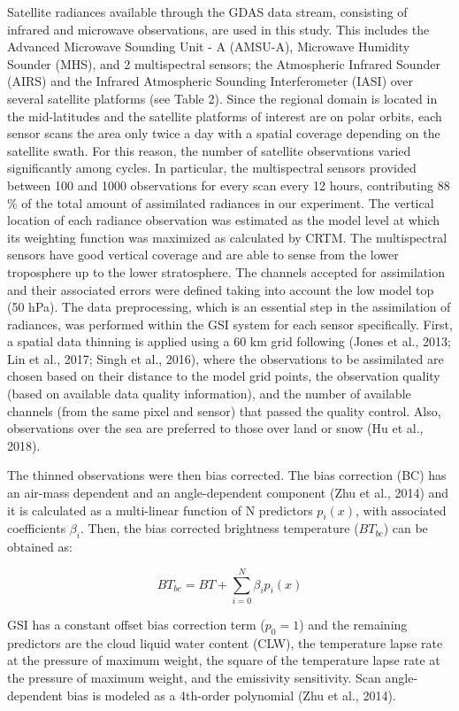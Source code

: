 \documentclass[final,5p,times,twocolumn,authoryear]{elsarticle} %
\begin{document}
Satellite radiances available through the GDAS data stream, consisting of infrared and microwave observations, are used in this study. This includes the Advanced Microwave Sounding Unit - A (AMSU-A), Microwave Humidity Sounder (MHS), and 2 multispectral sensors; the Atmospheric Infrared Sounder (AIRS) and the Infrared Atmospheric Sounding Interferometer (IASI) over several satellite platforms (see Table 2). Since the regional domain is located in the mid-latitudes and the satellite platforms of interest are on polar orbits, each sensor scans the area only twice a day with a spatial coverage depending on the satellite swath. For this reason, the number of satellite observations varied significantly among cycles. In particular, the multispectral sensors provided between 100 and 1000 observations for every scan every 12 hours, contributing 88 \% of the total amount of assimilated radiances in our experiment. The vertical location of each radiance observation was estimated as the model level at which its weighting function was maximized as calculated by CRTM. The multispectral sensors have good vertical coverage and are able to sense from the lower troposphere up to the lower stratosphere.
The channels accepted for assimilation and their associated errors were defined taking into account the low model top (50 hPa). The data preprocessing, which is an essential step in the assimilation of radiances, was performed within the GSI system for each sensor specifically. First, a spatial data thinning is applied using a 60 km grid following (Jones et al., 2013; Lin et al., 2017; Singh et al., 2016), where the observations to be assimilated are chosen based on their distance to the model grid points, the observation quality (based on available data quality information), and the number of available channels (from the same pixel and sensor) that passed the quality control. Also, observations over the sea are preferred to those over land or snow (Hu et al., 2018).

The thinned observations were then bias corrected. The bias correction (BC) has an air-mass dependent and an angle-dependent component (Zhu et al., 2014) and it is calculated as a multi-linear function of N predictors \(p_i(x)\), with associated coefficients \(\beta_i\). Then, the bias corrected brightness temperature (\(BT_{bc}\)) can be obtained as:

\[\mathit{BT_{bc}} =\mathit{ BT} + \sum_{i = 0}^{N} \beta_i p_i (x)\]

GSI has a constant offset bias correction term (\(p_0 = 1\)) and the remaining predictors are the cloud liquid water content (CLW), the temperature lapse rate at the pressure of maximum weight, the square of the temperature lapse rate at the pressure of maximum weight, and the emissivity sensitivity. Scan angle-dependent bias is modeled as a 4th-order polynomial (Zhu et al., 2014).
\end{document}
